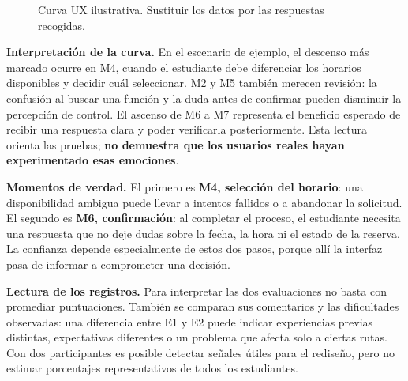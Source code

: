 \documentclass[10pt,letterpaper]{article}
\begin{document}
\begin{figure}[H]\centering
{}
\caption{Curva UX ilustrativa. Sustituir los datos por las respuestas recogidas.}\label{fig:curva}
\end{figure}

\textbf{Interpretación de la curva.} En el escenario de ejemplo, el descenso más marcado ocurre en M4, cuando el estudiante debe diferenciar los horarios disponibles y decidir cuál seleccionar. M2 y M5 también merecen revisión: la confusión al buscar una función y la duda antes de confirmar pueden disminuir la percepción de control. El ascenso de M6 a M7 representa el beneficio esperado de recibir una respuesta clara y poder verificarla posteriormente. Esta lectura orienta las pruebas; \textbf{no demuestra que los usuarios reales hayan experimentado esas emociones}.

\textbf{Momentos de verdad.} El primero es \textbf{M4, selección del horario}: una disponibilidad ambigua puede llevar a intentos fallidos o a abandonar la solicitud. El segundo es \textbf{M6, confirmación}: al completar el proceso, el estudiante necesita una respuesta que no deje dudas sobre la fecha, la hora ni el estado de la reserva. La confianza depende especialmente de estos dos pasos, porque allí la interfaz pasa de informar a comprometer una decisión.

\textbf{Lectura de los registros.} Para interpretar las dos evaluaciones no basta con promediar puntuaciones. También se comparan sus comentarios y las dificultades observadas: una diferencia entre E1 y E2 puede indicar experiencias previas distintas, expectativas diferentes o un problema que afecta solo a ciertas rutas. Con dos participantes es posible detectar señales útiles para el rediseño, pero no estimar porcentajes representativos de todos los estudiantes.
\end{document}

